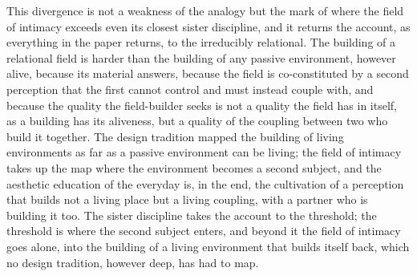 This divergence is not a weakness of the analogy but the mark of where the field of intimacy exceeds even its closest sister discipline, and it returns the account, as everything in the paper returns, to the irreducibly relational. The building of a relational field is harder than the building of any passive environment, however alive, because its material answers, because the field is co-constituted by a second perception that the first cannot control and must instead couple with, and because the quality the field-builder seeks is not a quality the field has in itself, as a building has its aliveness, but a quality of the coupling between two who build it together. The design tradition mapped the building of living environments as far as a passive environment can be living; the field of intimacy takes up the map where the environment becomes a second subject, and the aesthetic education of the everyday is, in the end, the cultivation of a perception that builds not a living place but a living coupling, with a partner who is building it too. The sister discipline takes the account to the threshold; the threshold is where the second subject enters, and beyond it the field of intimacy goes alone, into the building of a living environment that builds itself back, which no design tradition, however deep, has had to map.
